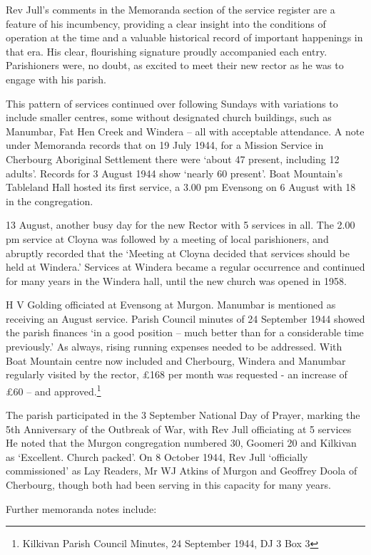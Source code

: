 Rev Jull's comments in the Memoranda section of the service register are a feature of his incumbency, providing a clear insight into the conditions of operation at the time and a valuable historical record of important happenings in that era. His clear, flourishing signature proudly accompanied each entry. Parishioners were, no doubt, as excited to meet their new rector as he was to engage with his parish.

This pattern of services continued over following Sundays with variations to include smaller centres, some without designated church buildings, such as Manumbar, Fat Hen Creek and Windera -- all with acceptable attendance. A note under Memoranda records that on 19 July 1944, for a Mission Service in Cherbourg Aboriginal Settlement there were `about 47 present, including 12 adults'. Records for 3 August 1944 show `nearly 60 present'. Boat Mountain's Tableland Hall hosted its first service, a 3.00 pm Evensong on 6 August with 18 in the congregation.

13 August, another busy day for the new Rector with 5 services in all. The 2.00 pm service at Cloyna was followed by a meeting of local parishioners, and abruptly recorded that the `Meeting at Cloyna decided that services should be held at Windera.' Services at Windera became a regular occurrence and continued for many years in the Windera hall, until the new church was opened in 1958.

H V Golding officiated at Evensong at Murgon. Manumbar is mentioned as receiving an August service. Parish Council minutes of 24 September 1944 showed the parish finances `in a good position -- much better than for a considerable time previously.' As always, rising running expenses needed to be addressed. With Boat Mountain centre now included and Cherbourg, Windera and Manumbar regularly visited by the rector, £168 per month was requested - an increase of £60 -- and approved.\footnote{Kilkivan Parish Council Minutes, 24 September 1944, DJ 3 Box 3}

The parish participated in the 3 September National Day of Prayer, marking the 5th Anniversary of the Outbreak of War, with Rev Jull officiating at 5 services He noted that the Murgon congregation numbered 30, Goomeri 20 and Kilkivan as `Excellent. Church packed'. On 8 October 1944, Rev Jull `officially commissioned' as Lay Readers, Mr WJ Atkins of Murgon and Geoffrey Doola of Cherbourg, though both had been serving in this capacity for many years.

Further memoranda notes include:

